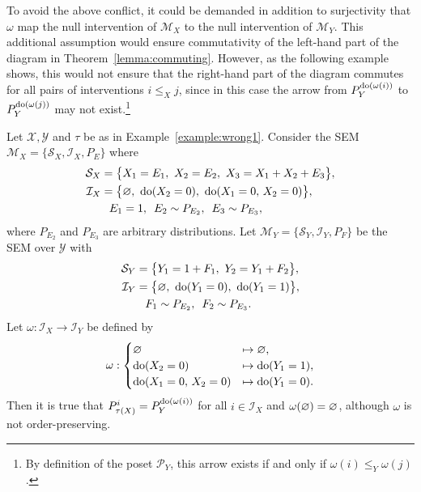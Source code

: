 To avoid the above conflict, it could be demanded in addition to surjectivity that $\omega$ map the null intervention of $\mathcal{M}_X$ to the null intervention of $\mathcal{M}_Y$.
This additional assumption would ensure commutativity of the left-hand part of the diagram in Theorem~\ref{lemma:commuting}.
However, as the following example shows, this would not ensure that the right-hand part of the diagram commutes for all pairs of interventions ${i \leq_X j}$, since in this case the arrow from $P_Y^{\operatorname{do}(\omega(i))}$ to $P_Y^{\operatorname{do}(\omega(j))}$ may not exist.\footnote{By definition of the poset $\mathcal{P}_Y$, this arrow exists if and only if $\omega(i) \leq_Y \omega(j)$.}

\medskip

\begin{example}\label{example:wrong2}
Let $\mathcal{X},\mathcal{Y}$ and $\tau$ be as in Example~\ref{example:wrong1}. Consider the SEM $\mathcal{M}_X=\{\mathcal{S}_X , \mathcal{I}_X, P_E\}$ where
%
\begin{align*}
\mathcal{S}_X = \big\{ & X_1 = E_1,\ X_2 = E_2, \ X_3 = X_1 + X_2 + E_3 \big\}, \\
%
\mathcal{I}_X = \big\{ & \nulli,\ \doop(X_2=0),\ \doop(X_1=0,\, X_2=0)\big\}, \\
%
E_1 & = 1,\ \,  E_2 \sim P_{E_2}, \  \, E_3 \sim P_{E_3},
\end{align*}
%
where $P_{E_2}$ and $P_{E_3}$ are arbitrary distributions.
%
Let $\mathcal{M}_Y =\{\mathcal{S}_Y , \mathcal{I}_Y, P_F\}$ be the SEM over $\mathcal{Y}$ with
%
\begin{align*}
\mathcal{S}_Y = \big\{ & Y_1 =1+ F_1,\ Y_2 = Y_1 + F_2 \big\}, \\
%
\mathcal{I}_Y = \big\{ & \nulli,\ \doop(Y_1=0),\ \doop(Y_1=1) \big\}, \\
%
F_1 &\sim P_{E_2},  \  \, F_2 \sim P_{E_3}.
\end{align*}
%
Let ${\omega:\mathcal{I}_X \to \mathcal{I}_Y}$ be defined by
%
\begin{align*}
\omega: \begin{cases}
\varnothing &\mapsto \varnothing, \\
\operatorname{do}(X_2=0) &\mapsto \operatorname{do}(Y_1=1), \\
\operatorname{do}(X_1=0,\, X_2=0) &\mapsto \operatorname{do}(Y_1=0). \\
\end{cases}
\end{align*}
%
Then it is true that ${P_{\tau(X)}^{i} = P_Y^{\operatorname{do}(\omega(i))}}$ for all ${i \in \mathcal{I}_X}$ and $\omega(\varnothing)=\varnothing$, although $\omega$ is not order-preserving.
\end{example}

